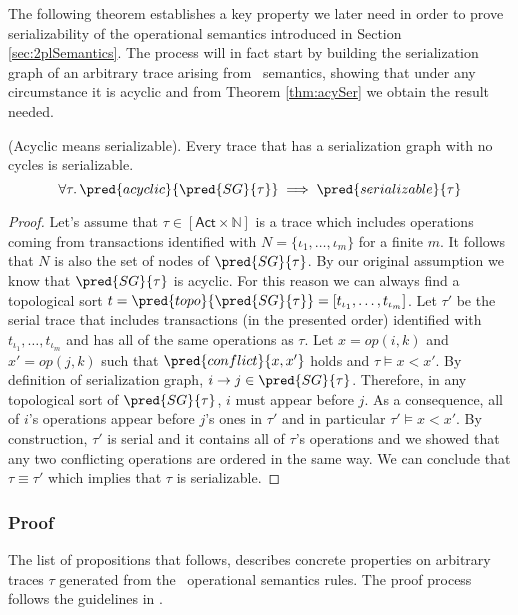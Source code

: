 The following theorem establishes a key property we later need in order to prove serializability of the operational semantics introduced in Section \ref{sec:2plSemantics}. The process will in fact start by building the serialization graph of an arbitrary trace arising from \tpl\ semantics, showing that under any circumstance it is acyclic and from Theorem \ref{thm:acySer} we obtain the result needed.
\begin{thm}
	\label{thm:acySer}
	(Acyclic means serializable).
	Every trace that has a serialization graph with no cycles is serializable.
	\[
		\forall \tau \ldotp \pred{acyclic}{\pred{SG}{\tau}} \implies \pred{serializable}{\tau}
	\]
	
	\begin{proof}
	Let's assume that $\tau \in [\mathsf{Act} \times \mathds{N}]$ is a trace which includes operations coming from transactions identified with $N = \{ \iota_1, \ldots, \iota_m \}$ for a finite $m$. It follows that $N$ is also the set of nodes of $\pred{SG}{\tau}$. By our original assumption we know that $\pred{SG}{\tau}$ is acyclic. For this reason we can always find a topological sort $t = \pred{topo}{\pred{SG}{\tau}} = [t_{\iota_1}, \ldots, t_{\iota_m}]$. Let $\tau'$ be the serial trace that includes transactions (in the presented order) identified with $t_{\iota_1}, \ldots, t_{\iota_m}$ and has all of the same operations as $\tau$. Let $x = op(i, k)$ and $x' = op(j, k)$ such that $\pred{conflict}{x, x'}$ holds and $\tau \vDash x < x'$. By definition of serialization graph, $i \rightarrow j \in \pred{SG}{\tau}$. Therefore, in any topological sort of $\pred{SG}{\tau}$, $i$ must appear before $j$. As a consequence, all of $i$'s operations appear before $j$'s ones in $\tau'$ and in particular $\tau' \vDash x < x'$. By construction, $\tau'$ is serial and it contains all of $\tau$'s operations and we showed that any two conflicting operations are ordered in the same way. We can conclude that $\tau \equiv \tau'$ which implies that $\tau$ is serializable.
	\end{proof}
\end{thm}

\subsubsection{Proof}

The list of propositions that follows, describes concrete properties on arbitrary traces $\tau$ generated from the \tpl\ operational semantics rules. The proof process follows the guidelines in \cite{ccontrol}.

